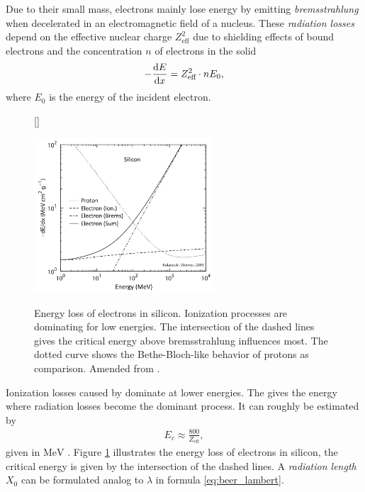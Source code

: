 Due to their small mass, electrons mainly lose energy by emitting \textit{brems\-strah\-lung} when decelerated in an electromagnetic field of a nucleus. These \textit{radiation losses} depend on the effective nuclear charge $Z_{\text{eff}}^2$ due to shielding effects of bound electrons and the concentration $n$ of electrons in the solid \cite{rodnyi}
\begin{align}
-\dv{E}{x}=Z_{\text{eff}}^2\cdot nE_0, 
\label{eq:energy_loss_electrons}
\end{align}  
where $E_0$ is the energy of the incident electron. \par   
\begin{figure}[t]
	[\FBwidth]
	{\caption[Interaction of electrons with matter]{Energy loss of electrons in silicon. Ionization processes are dominating for low energies. The intersection of the dashed lines gives the critical energy above bremsstrahlung influences most. The dotted curve shows the Bethe-Bloch-like behavior of protons as comparison. Amended from \cite{wermes}.}    
		\label{fig:ch1:electrons}}
	{\includegraphics[width=0.6\textwidth]{./graphics/ch1/energy_loss_electrons.png}}
\end{figure}
Ionization losses caused by  dominate at lower energies. The  gives the energy where radiation losses become the dominant process. It can roughly be estimated by 
\begin{align}
E_c\approx\frac{800}{Z_{\text{eff}}},
\label{eq:radiation_length}
\end{align}
given in $\si{\MeV}$ \cite{rodnyi}. Figure \ref{fig:ch1:electrons} illustrates the energy loss of electrons in silicon, the critical energy is given by the intersection of the dashed lines. A \textit{radiation length} $X_0$ can be formulated analog to $\lambda$ in formula \eqref{eq:beer_lambert}. \par 
